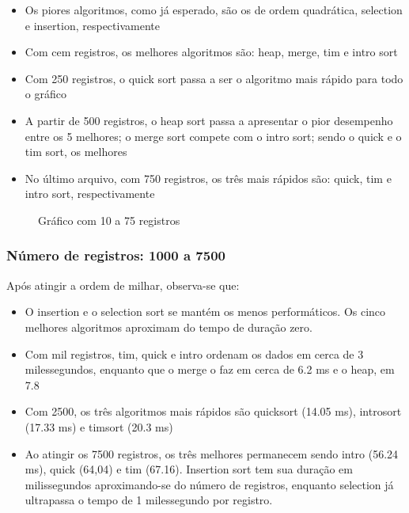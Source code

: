 \documentclass[a4paper,12pt]{scrartcl}
\begin{document}
\begin{itemize}
    \item
    Os piores algoritmos, como já esperado, são os de ordem quadrática, selection e insertion, respectivamente
    
    \item
    Com cem registros, os melhores algoritmos são: heap, merge, tim e intro sort
    
    \item
    Com 250 registros, o quick sort passa a ser o algoritmo mais rápido para todo o gráfico
    
    \item
    A partir de 500 registros, o heap sort passa a apresentar o pior desempenho entre os 5 melhores; o merge sort compete com o intro sort; sendo o quick e o tim sort, os melhores
    
    \item
    No último arquivo, com 750 registros, os três mais rápidos são: quick, tim e intro sort, respectivamente
    
\end{itemize}

\begin{figure}[H]
    \centering
    
    \caption{Gráfico com 10 a 75 registros}
    \label{mapaSelect}
\end{figure}

\subsubsection{Número de registros: 1000 a 7500}

Após atingir a ordem de milhar, observa-se que:
\begin{itemize}
    \item
    O insertion e o selection sort se mantém os menos performáticos. Os cinco melhores algoritmos aproximam do tempo de duração zero.
    
    \item
    Com mil registros, tim, quick e intro ordenam os dados em cerca de 3 milessegundos, enquanto que o merge o faz em cerca de 6.2 ms e o heap, em 7.8
    
    \item
    Com 2500, os três algoritmos mais rápidos são quicksort (14.05 ms), introsort (17.33 ms) e timsort (20.3 ms)

    \item
    Ao atingir os 7500 registros, os três melhores permanecem sendo intro (56.24 ms), quick (64,04) e tim (67.16). Insertion sort tem sua duração em milissegundos aproximando-se do número de registros, enquanto selection já ultrapassa o tempo de 1 milessegundo por registro.


\end{itemize}
\end{document}
